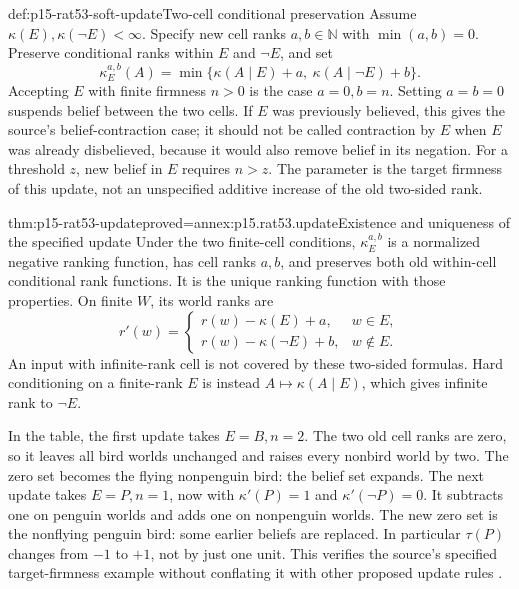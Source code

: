 \begin{hbdefinition}{def:p15-rat53-soft-update}{Two-cell conditional preservation}
Assume \(\kappa(E),\kappa(\neg E)<\infty\).
Specify new cell ranks \(a,b\in\mathbb N\) with \(\min(a,b)=0\).
Preserve conditional ranks within \(E\) and \(\neg E\), and set
\[
 \kappa^{a,b}_E(A)=
 \min\{\kappa(A\mid E)+a,\ \kappa(A\mid\neg E)+b\}.
\]
Accepting \(E\) with finite firmness \(n>0\) is the case \(a=0,b=n\).
Setting \(a=b=0\) suspends belief between the two cells.  If \(E\)
was previously believed, this gives the source's belief-contraction case;
it should not be called contraction by \(E\) when \(E\) was already
disbelieved, because it would also remove belief in its negation.
For a threshold \(z\), new belief in \(E\) requires \(n>z\).
The parameter is the target firmness of this update, not an unspecified
additive increase of the old two-sided rank.
\end{hbdefinition}

\begin{hbtheorem}{thm:p15-rat53-update}{proved=annex:p15.rat53.update}{Existence and uniqueness of the specified update}
Under the two finite-cell conditions, \(\kappa^{a,b}_E\) is a normalized
negative ranking function, has cell ranks \(a,b\), and preserves both old
within-cell conditional rank functions.  It is the unique ranking function
with those properties.  On finite \(W\), its world ranks are
\[
 r'(w)=
 \begin{cases}
 r(w)-\kappa(E)+a,&w\in E,\\
 r(w)-\kappa(\neg E)+b,&w\notin E.
 \end{cases}
\]
An input with infinite-rank cell is not covered by these two-sided formulas.
Hard conditioning on a finite-rank \(E\) is instead
\(A\mapsto\kappa(A\mid E)\), which gives infinite rank to \(\neg E\).
\end{hbtheorem}

In the table, the first update takes \(E=B,n=2\).  The two old cell ranks
are zero, so it leaves all bird worlds unchanged and raises every nonbird
world by two.  The zero set becomes the flying nonpenguin bird: the belief
set expands.  The next update takes \(E=P,n=1\), now with
\(\kappa'(P)=1\) and \(\kappa'(\neg P)=0\).  It subtracts one on
penguin worlds and adds one on nonpenguin worlds.  The new zero set is the
nonflying penguin bird: some earlier beliefs are replaced.  In particular
\(\tau(P)\) changes from \(-1\) to \(+1\), not by just one unit.
This verifies the source's specified target-firmness example without conflating
it with other proposed update rules
\parencite[p.~340 and n.~6]{KernIsbernerSkovgaardOlsenSpohn2021Ranking}.

